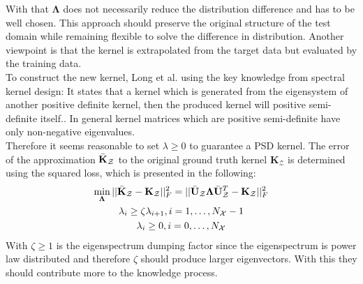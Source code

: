 With that $\boldsymbol{\Lambda}$ does not necessarily reduce the distribution difference and has to be well chosen.
This approach should preserve the original structure of the test domain while remaining flexible to solve the difference in distribution.
Another viewpoint is that the kernel is extrapolated from the target data but evaluated by the training data.\cite{Long.2015}\\
To construct the new kernel, Long et al. using the key knowledge from spectral kernel design:
It states that a kernel which is generated from the eigensystem of another positive definite kernel, then the produced kernel will positive semi-definite itself.\cite{KaiZhang.2013}.
In general kernel matrices which are positive semi-definite have only non-negative eigenvalues.\cite[p. 30]{Scholkopf.2001}\\
Therefore it seems reasonable to set $\lambda \ge 0$ to guarantee a \acs{PSD} kernel.
The error of the approximation $\bar{\mathbf{K}}_\mathcal{Z}$ to the original ground truth kernel $\mathbf{K}_\mathcal{Z}$ is determined using the squared loss, which is presented in the following:\cite{Long.2015}
\begin{equation}\label{EqTKLSquareErrorLoss}
	\begin{gathered}
		\min_{\boldsymbol{\Lambda}} || \bar{\mathbf{K}}_\mathcal{Z} - \mathbf{K}_\mathcal{Z}||^2_F = || \bar{\mathbf{U}}_\mathcal{Z} \boldsymbol{\Lambda}  \bar{\mathbf{U}}_\mathcal{Z}^T - \mathbf{K}_\mathcal{Z} ||^2_F \\
		\lambda_i \ge \zeta \lambda_{i+1}, i = 1,\dots,N_\mathcal{X}-1 \\
		\lambda_i \ge 0,  i = 0,\dots,N_\mathcal{X}
	\end{gathered}
\end{equation}
With $\zeta \ge 1$ is the eigenspectrum dumping factor since the eigenspectrum is power law distributed and therefore $\zeta$ should produce larger eigenvectors.
With this they should contribute more to the knowledge process.\cite{Long.2015}
